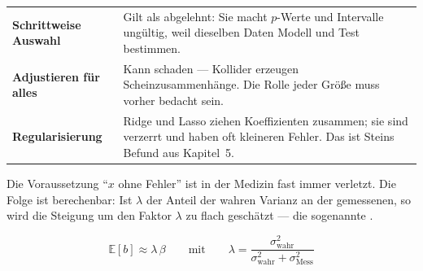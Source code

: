 \begin{forschung}
\begin{center}
{\small
\renewcommand{\arraystretch}{1.45}
\begin{tabular}{@{}P{2.6cm}P{5.6cm}@{}}
\toprule
\textbf{Schrittweise Auswahl} & Gilt als abgelehnt: Sie macht $p$-Werte und Intervalle ungültig, weil dieselben Daten Modell und Test bestimmen.\\
\textbf{Adjustieren für alles} & Kann schaden --- Kollider erzeugen Scheinzusammenhänge. Die Rolle jeder Größe muss vorher bedacht sein.\\
\textbf{Regularisierung} & Ridge und Lasso ziehen Koeffizienten zusammen; sie sind verzerrt und haben oft kleineren Fehler. Das ist Steins Befund aus Kapitel~5.\\
\bottomrule
\end{tabular}}
\end{center}

Die Voraussetzung \enquote{$x$ ohne Fehler} ist in der Medizin fast immer verletzt. Die Folge ist berechenbar: Ist $\lambda$ der Anteil der wahren Varianz an der gemessenen, so wird die Steigung um den Faktor $\lambda$ zu flach geschätzt --- die sogenannte .

\[ \mathbb{E}[b] \approx \lambda\,\beta \qquad \text{mit} \qquad \lambda = \frac{\sigma^2_{\text{wahr}}}{\sigma^2_{\text{wahr}} + \sigma^2_{\text{Mess}}} \]

\begin{center}
\begin{minipage}{0.88\textwidth}
\end{minipage}
\end{center}
\end{forschung}

